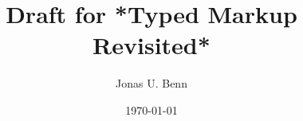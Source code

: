 \documentclass[format=acmsmall, review=true, screen=true, natbib=false]{acmart}
\author{Jonas U. Benn}
\date{\today}
\title{Draft for *Typed Markup Revisited*}
\begin{document}




\maketitle

\clearpage
\cite{blankpage}
\clearpage



\printbibliography
\end{document}
